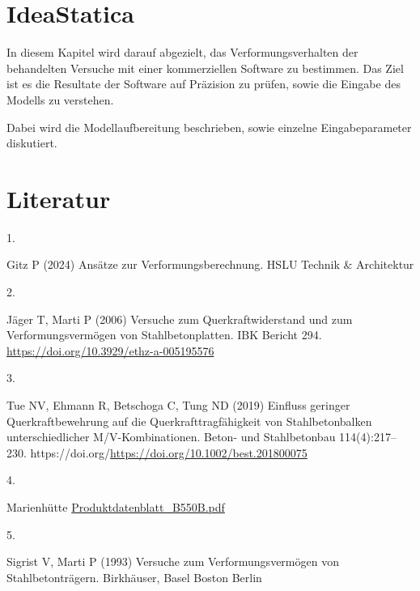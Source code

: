 \documentclass[
  11pt,
  letterpaper,
]{scrreprt}
\newlength{\cslhangindent}
\newlength{\csllabelwidth}
\newenvironment{CSLReferences}[2] %
 {\begin{list}{}{%
  \setlength{\itemindent}{0pt}
  \setlength{\leftmargin}{0pt}
  \setlength{\parsep}{0pt}
  \ifodd #1
   \setlength{\leftmargin}{\cslhangindent}
   \setlength{\itemindent}{-1\cslhangindent}
  \fi
  \setlength{\itemsep}{#2\baselineskip}}}
 {\end{list}}
\newcommand{\CSLLeftMargin}[1]{\parbox[t]{\csllabelwidth}{\strut#1\strut}}
\newcommand{\CSLRightInline}[1]{\parbox[t]{\linewidth - \csllabelwidth}{\strut#1\strut}}
\begin{document}

\chapter{IdeaStatica}\label{ideastatica}

In diesem Kapitel wird darauf abgezielt, das Verformungsverhalten der
behandelten Versuche mit einer kommerziellen Software zu bestimmen. Das
Ziel ist es die Resultate der Software auf Präzision zu prüfen, sowie
die Eingabe des Modells zu verstehen.

Dabei wird die Modellaufbereitung beschrieben, sowie einzelne
Eingabeparameter diskutiert.


\chapter*{Literatur}\label{literatur}


\label{refs}
\begin{CSLReferences}{0}{1}
\CSLLeftMargin{1. }%
\CSLRightInline{Gitz P (2024) Ansätze zur {Verformungsberechnung}. HSLU
Technik \& Architektur}

\CSLLeftMargin{2. }%
\CSLRightInline{Jäger T, Marti P (2006) Versuche zum
{Querkraftwiderstand} und zum {Verformungsvermögen} von
{Stahlbetonplatten}. IBK Bericht 294.
\url{https://doi.org/10.3929/ethz-a-005195576}}

\CSLLeftMargin{3. }%
\CSLRightInline{Tue NV, Ehmann R, Betschoga C, Tung ND (2019) Einfluss
geringer {Querkraftbewehrung} auf die {Querkrafttragfähigkeit} von
{Stahlbetonbalken} unterschiedlicher {M}/{V}-{Kombinationen}. Beton- und
Stahlbetonbau 114(4):217--230.
https://doi.org/\url{https://doi.org/10.1002/best.201800075}}

\CSLLeftMargin{4. }%
\CSLRightInline{Marienhütte
\href{https://www.marienhuette.at/wp-content/uploads/Produktdatenblatt-B550B.pdf}{Produktdatenblatt\_B550B.pdf}}

\CSLLeftMargin{5. }%
\CSLRightInline{Sigrist V, Marti P (1993) Versuche zum
{Verformungsvermögen} von {Stahlbetonträgern}. Birkhäuser, Basel Boston
Berlin}

\end{CSLReferences}
\end{document}
